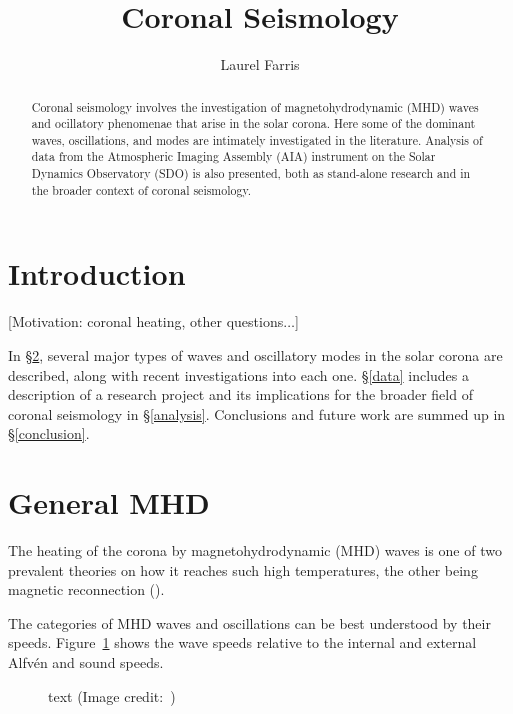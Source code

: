 \documentclass[preprint2]{aastex}
\newcommand{\mhd}{magnetohydrodynamic}
\begin{document}
\title{\vspace{-0.75in}Coronal Seismology}
\author{\vspace{-0.25in}Laurel Farris}

\begin{abstract}
    Coronal seismology involves the investigation of {\mhd} (MHD) waves and
ocillatory phenomenae that arise in the solar corona. Here some of the
dominant waves, oscillations, and modes are intimately investigated in
the literature. Analysis of data from the Atmospheric Imaging
Assembly (AIA) instrument on the Solar Dynamics Observatory (SDO) is
also presented, both as stand-alone research and in the broader
context of coronal seismology.
\end{abstract}



\section{Introduction}\label{intro}

[Motivation: coronal heating, other questions$\ldots$]

In \S\ref{MHD}, several major types of waves and oscillatory modes in
the solar corona are described, along with recent investigations into
each one. \S\ref{data} includes a description of a research project and
its implications for the broader field of coronal seismology in
\S\ref{analysis}. Conclusions and future work are summed up in
\S\ref{conclusion}.


\section{General MHD}\label{MHD}
The heating of the corona by magnetohydrodynamic (MHD)
waves is one of two prevalent theories
on how it reaches such high temperatures, the other being magnetic
reconnection (\cite{acoustic_1}).

The categories of MHD waves and oscillations can be best understood
by their speeds. Figure~\ref{speeds} shows the wave speeds relative
to the internal and external Alfv\'en and sound speeds.

\begin{figure}%
    \caption{text (Image credit:~\cite{Nak})}
    \label{speeds}
\end{figure}
\end{document}
